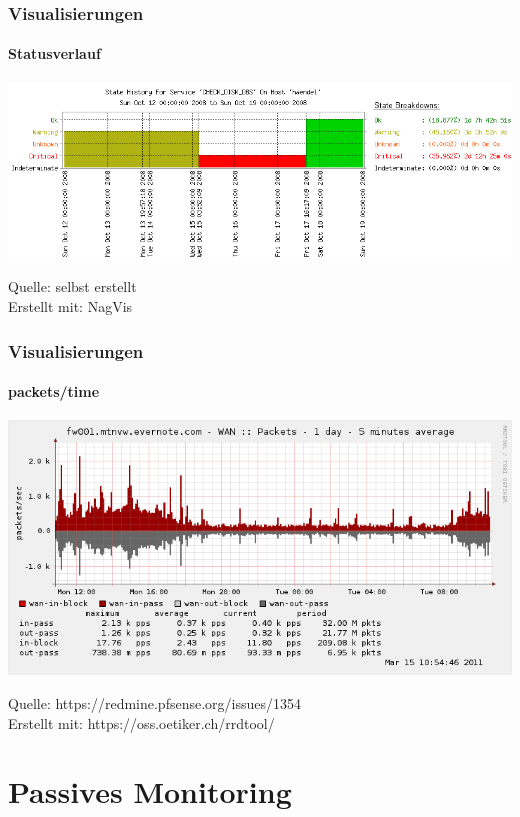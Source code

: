 \documentclass[10pt]{beamer} %
\begin{document}
\begin{frame}
\end{frame}

\begin{frame}
\frametitle{Visualisierungen}
\framesubtitle{Statusverlauf}

    \includegraphics[scale=0.45]{img/nag_trend.png}
    \vspace{0.5cm}
    
    \footnoterule
    \footnotesize{
        Quelle:          selbst erstellt\\
        Erstellt mit:    NagVis}

\end{frame}
\begin{frame}
\frametitle{Visualisierungen}
\framesubtitle{packets/time}

\includegraphics[scale=0.4]{img/status_rrd_graph_img.png}
\vspace{0.5cm}

\footnoterule
\footnotesize{
   Quelle:          https://redmine.pfsense.org/issues/1354\\
   Erstellt mit:    https://oss.oetiker.ch/rrdtool/}


\end{frame}
\section{Passives Monitoring}
\frame{\tableofcontents[currentsection]}
\end{document}
